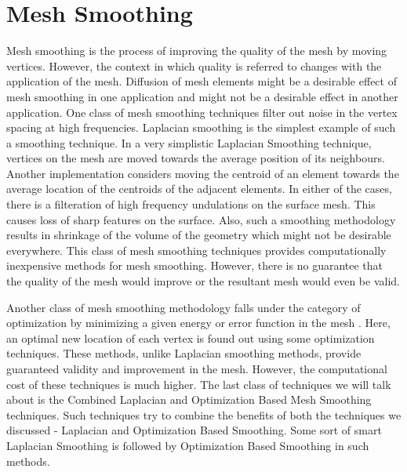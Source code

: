 \section{Mesh Smoothing}

Mesh smoothing is the process of improving the quality of the mesh by moving vertices. However, the context in which quality is referred to changes with the application of the mesh. Diffusion of mesh elements might be a desirable effect of mesh smoothing in one application and might not be a desirable effect in another application. One class of mesh smoothing techniques filter out noise in the vertex spacing at high frequencies. Laplacian smoothing is the simplest example of such a smoothing technique. In a very simplistic Laplacian Smoothing technique, vertices on the mesh are moved towards the average position of its neighbours. Another implementation considers moving the centroid of an element towards the average location of the centroids of the adjacent elements. In either of the cases, there is a filteration of high frequency undulations on the surface mesh. This causes loss of sharp features on the surface. Also, such a smoothing methodology results in shrinkage of the volume of the geometry which might not be desirable everywhere. This class of mesh smoothing techniques provides computationally inexpensive methods for mesh smoothing. However, there is no guarantee that the quality of the mesh would improve or the resultant mesh would even be valid.

Another class of mesh smoothing methodology falls under the category of optimization by minimizing a given energy or error function in the mesh \cite{freitag1997tetrahedral, zhou2000angle, chen2004mesh, parthasarathy1991constrained, shephard1991automatic}. Here, an optimal new location of each vertex is found out using some optimization techniques. These methods, unlike Laplacian smoothing methods, provide guaranteed validity and improvement in the mesh. However, the computational cost of these techniques is much higher. The last class of techniques we will talk about is the Combined Laplacian and Optimization Based Mesh Smoothing techniques\cite{freitag1997combining, canann1998approach}. Such techniques try to combine the benefits of both the techniques we discussed - Laplacian and Optimization Based Smoothing. Some sort of smart Laplacian Smoothing is followed by Optimization Based Smoothing in such methods.

